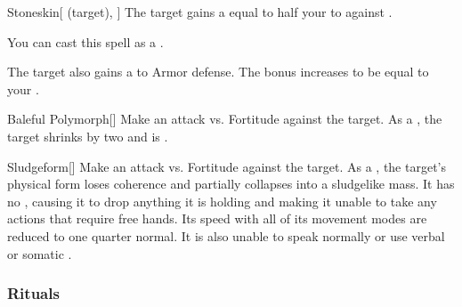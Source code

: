 \lowercase{\hypertarget{spell:Stoneskin}{}}\label{spell:Stoneskin}
\begin{attuneability}[Rank 4]{\hypertarget{spell:Stoneskin}{Stoneskin}}[ (target), ]
The target gains a  equal to half your  to  against .

You can cast this spell as a .

\rankline
{} The target also gains a   to Armor defense.
 The bonus increases to be equal to your .
\end{attuneability}
\vspace{0.25em}



\lowercase{\hypertarget{spell:Baleful Polymorph}{}}\label{spell:Baleful Polymorph}
\begin{freeability}[Rank 7]{\hypertarget{spell:Baleful Polymorph}{Baleful Polymorph}}[]
Make an attack vs. Fortitude against the target.
\hit As a , the target shrinks by two  and is .
\end{freeability}
\vspace{0.25em}



\lowercase{\hypertarget{spell:Sludgeform}{}}\label{spell:Sludgeform}
\begin{freeability}[Rank 8]{\hypertarget{spell:Sludgeform}{Sludgeform}}[]
Make an attack vs. Fortitude against the target.
\hit As a , the target's physical form loses coherence and partially collapses into a sludgelike mass.
It has no , causing it to drop anything it is holding and making it unable to take any actions that require free hands.
Its speed with all of its  movement modes are reduced to one quarter normal.
It is also unable to speak normally or use verbal or somatic .
\end{freeability}
\vspace{0.25em}



\subsubsection{Rituals}


